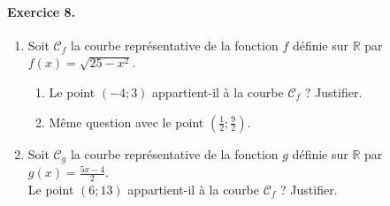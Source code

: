 \documentclass[11pt]{article}
\begin{document}
\paragraph{Exercice 8.}
\begin{enumerate}
  \item Soit $\mathscr C_f$ la courbe représentative de la fonction $f$ définie
    sur $\mathbb{R}$ par $f(x)=\sqrt{25-x^2}$.
    \begin{enumerate}
      \item Le point $(-4;3)$ appartient-il à la courbe $\mathscr C_f$ ?
        Justifier.
      \item Même question avec le point $\left( \frac{1}{2};\frac{9}{2}
        \right)$.
    \end{enumerate}
  \item Soit $\mathscr C_g$ la courbe représentative de la fonction $g$ définie
    sur $\mathbb{R}$ par $g(x) = \frac{5x-4}{2}$.\\
    Le point $(6; 13)$ appartient-il à la courbe $\mathscr C_f$ ? Justifier.
\end{enumerate}
\end{document}
